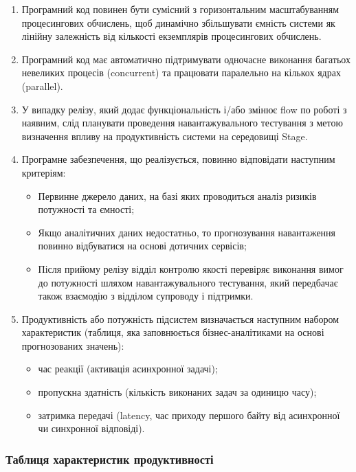 \documentclass{article}
\begin{document}
\begin{enumerate}
  \item Програмний код повинен бути сумісний з горизонтальним масштабуванням процесингових обчислень,
        щоб динамічно збільшувати ємність системи як лінійну залежність від кількості екземплярів процесингових обчислень.
  \item Програмний код має автоматично підтримувати одночасне виконання багатьох невеликих процесів (concurrent)
        та працювати паралельно на кількох ядрах (parallel).
  \item У випадку релізу, який додає функціональність і/або змінює flow по роботі з наявним, слід планувати
        проведення навантажувального тестування з метою визначення впливу на продуктивність системи на середовищі Stage.
  \item Програмне забезпечення, що реалізується, повинно відповідати наступним критеріям:
    \begin{itemize}
      \item Первинне джерело даних, на базі яких проводиться аналіз ризиків потужності та ємності;
      \item Якщо аналітичних даних недостатньо, то прогнозування навантаження повинно відбуватися на основі дотичних сервісів;
      \item Після прийому релізу відділ контролю якості перевіряє виконання вимог до потужності шляхом навантажувального тестування, який передбачає також взаємодію з відділом супроводу і підтримки.
    \end{itemize}

  \item Продуктивність або потужність підсистем визначається наступним набором характеристик (таблиця, яка заповнюється бізнес-аналітиками на основі прогнозованих значень):
    \begin{itemize}
      \item час реакції (активація асинхронної задачі);
      \item пропускна здатність (кількість виконаних задач за одиницю часу);
      \item затримка передачі (latency, час приходу першого байту від асинхронної чи синхронної відповіді).
    \end{itemize}
\end{enumerate}

\subsubsection{Таблиця характеристик продуктивності}
\end{document}
